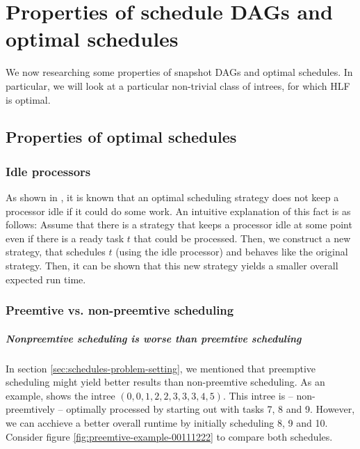 \chapter{Properties of schedule DAGs and optimal schedules}
\label{chap:p3}

We now researching some properties of snapshot DAGs and optimal schedules. In particular, we will look at a particular non-trivial class of intrees, for which HLF is optimal.

\section{Properties of optimal schedules}
\label{sec:optimal-schedules-properties}

\subsection{Idle processors}
\label{sec:optimal-schedule-no-idleness}

As shown in \cite{chandyreynoldslargepaper1979}, it is known that an optimal scheduling strategy does not keep a processor idle if it could do some work. An intuitive explanation of this fact is as follows: Assume that there is a strategy that keeps a processor idle at some point even if there is a ready task $t$ that could be processed. Then, we construct a new strategy, that schedules $t$ (using the idle processor) and behaves like the original strategy. Then, it can be shown that this new strategy yields a smaller overall expected run time.

\subsection{Preemtive vs. non-preemtive scheduling}
\label{sec:optimal-schedules-preemtive}

\paragraph{Nonpreemtive scheduling is worse than preemtive scheduling}

\label{preemtiveness-explanation}
In section \ref{sec:schedules-problem-setting}, we mentioned that preemptive scheduling might yield better results than non-preemtive scheduling. As an example, \cite{MoritzMaasDiploma} shows the intree $(0,0,1,2,2,3,3,3,4,5)$. This intree is -- non-preemtively -- optimally processed by starting out with tasks 7, 8 and 9. However, we can acchieve a better overall runtime by initially scheduling 8, 9 and 10. Consider figure \ref{fig:preemtive-example-00111222} to compare both schedules.

